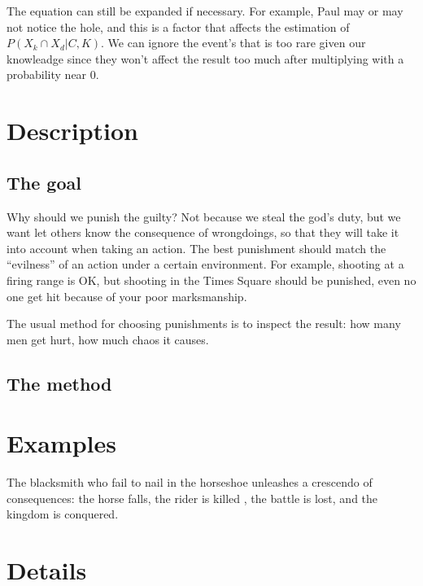 \documentclass{manuscript}
\begin{document}
    The equation can still be expanded if necessary. For example, Paul may or may not notice the hole, and this is a
    factor that affects the estimation of $P(X_k \cap X_d | C, K)$. We can ignore the event's that is too rare given our
    knowleadge since they won't affect the result too much after multiplying with a probability near 0.

    \section{Description}

    \subsection{The goal}

    Why should we punish the guilty? Not because we steal the god's duty, but we want let others know the consequence of
    wrongdoings, so that they will take it into account when taking an action. The best punishment should match the
    ``evilness'' of an action under a certain environment. For example, shooting at a firing range is OK, but shooting
    in the Times Square should be punished, even no one get hit because of your poor marksmanship.

    The usual method for choosing punishments is to inspect the result: how many men get hurt, how much chaos it causes.

    \subsection{The method}

    \section{Examples}

    The blacksmith who fail to nail in the horseshoe unleashes a crescendo of consequences: the horse falls, the rider is
    killed , the battle is lost, and the kingdom is conquered.

    \section{Details}

    
\end{document}
